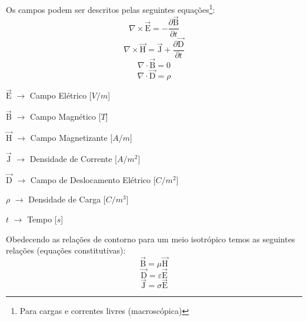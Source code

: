         Os campos podem ser descritos pelas seguintes equações\footnote{Para cargas e correntes livres
        (macroscópica)}:
            \begin{equation}
                \label{rot_elet_max}
                \nabla \times \vec{\textrm{E}}=-\frac{\partial \vec{\textrm{B}}}{\partial t} 
            \end{equation}
            \begin{equation}
                \label{rot_mag_max}
                \nabla \times \vec{\textrm{H}} = \vec{\textrm{J}} + \frac{\partial \vec{\textrm{D}}}{\partial t}
            \end{equation}
            \begin{equation}
                \nabla \cdot \vec{\textrm{B}} = 0
            \end{equation}
            \begin{equation}
                \nabla \cdot \vec{\textrm{D}} = \rho
            \end{equation}

            $\vec{\textrm{E}}$ $\rightarrow$ Campo Elétrico [$V/m$]
	    
            $\vec{\textrm{B}}$ $\rightarrow$ Campo Magnético [$T$]
	    
            $\vec{\textrm{H}}$ $\rightarrow$ Campo Magnetizante [$A/m$]
	    
            $\vec{\textrm{J}}$ $\rightarrow$ Densidade de Corrente [$A/m^2$]
	    
            $\vec{\textrm{D}}$ $\rightarrow$ Campo de Deslocamento Elétrico [$C/m^2$]
	    
            $\rho$ $\rightarrow$ Densidade de Carga [$C/m^3$]
	    
            $t$ $\rightarrow$ Tempo [$s$]

            Obedecendo as relações de contorno para um meio isotrópico temos as seguintes
            relações (equações constitutivas):
            \begin{equation}
                \label{con_B}
                \vec{\textrm{B}} = \mu \vec{\textrm{H}}
            \end{equation}
            \begin{equation}
                \label{con_D}
                \vec{\textrm{D}} = \varepsilon  \vec{\textrm{E}}
            \end{equation}
            \begin{equation}
                \label{con_J}
                \vec{\textrm{J}} = \sigma \vec{\textrm{E}}
            \end{equation}
	    
